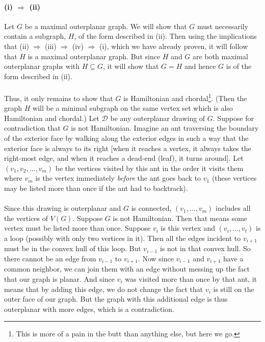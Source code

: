 \documentclass[10pt,a4paper]{article}
\newcommand{\Dee}{\mathcal{D}}
\newcommand{\1}{\mathbf{1}}
\begin{document}
\paragraph*{(i) $\Rightarrow$ (ii)}Let $G$ be a maximal outerplanar graph.  We will show that $G$ must necessarily contain a subgraph, $H$, of the form described in (ii).  Then using the implications that (ii) $\Rightarrow$ (iii) $\Rightarrow$ (iv) $\Rightarrow$ (i), which we have already proven, it will follow that $H$ is a maximal outerplanar graph.  But since $H$ and $G$ are both maximal outerplanar graphs with $H \subseteq G$, it will show that $G = H$ and hence $G$ is of the form described in (ii).
\paragraph*{}Thus, it only remains to show that $G$ is Hamiltonian and chordal\footnote{This is more of a pain in the butt than anything else, but here we go.}.  (Then the graph $H$ will be a minimal subgraph on the same vertex set which is also Hamiltonian and chordal.)  Let $\Dee$ be any outerplanar drawing of $G$.  Suppose for contradiction that $G$ is not Hamiltonian.  Imagine an ant traversing the boundary of the exterior face by walking along the exterior edges in such a way that the exterior face is always to its right [when it reaches a vertex, it always takes the right-most edge, and when it reaches a dead-end (leaf), it turns around].  Let $(v_1, v_2, \ldots , v_{m})$ be the vertices visited by this ant in the order it visits them where $v_{m}$ is the vertex immediately \textit{before} the ant goes back to $v_1$ (these vertices may be listed more than once if the ant had to backtrack).
\paragraph*{}Since this drawing is outerplanar and $G$ is connected, $(v_1, \ldots, v_m)$ includes all the vertices of $V(G)$.  Suppose $G$ is not Hamiltonian.  Then that means some vertex must be listed more than once.  Suppose $v_i$ is this vertex and $(v_i, \ldots , v_{t})$ is a loop (possibly with only two vertices in it).  Then all the edges incident to $v_{i+1}$ must be in the convex hull of this loop.  But $v_{i-1}$ is not in that convex hull.  So there cannot be an edge from $v_{i-1}$ to $v_{i+1}$.  Now since $v_{i-1}$ and $v_{i+1}$ have a common neighbor, we can join them with an edge without messing up the fact that our graph is planar.  And since $v_i$ was visited more than once by that ant, it means that by adding this edge, we do not change the fact that $v_i$ is still on the outer face of our graph.  But the graph with this additional edge is thus outerplanar with more edges, which is a contradiction.
\end{document}
